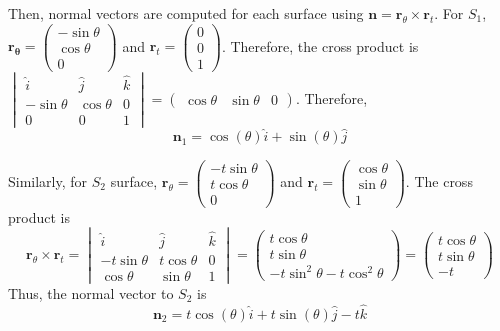\documentclass{article}
\begin{document}
Then, normal vectors are computed for each surface using $\mathbf{n} = \mathbf{r}_{\theta} \times \mathbf{r}_{t}$. For $S_1$, $\mathbf{r_\theta} = \begin{pmatrix} -\sin \theta \\ \cos \theta \\ 0  \end{pmatrix}$ and $\mathbf{r}_{t} = \begin{pmatrix} 0 \\ 0 \\ 1  \end{pmatrix}$. Therefore, the cross product is $\begin{vmatrix} \hat{i} & \hat{j} & \hat{k} \\ -\sin \theta & \cos \theta & 0 \\ 0 & 0 & 1 \end{vmatrix} = \begin{pmatrix} \cos \theta & \sin \theta & 0  \end{pmatrix}$. Therefore,
\begin{equation*}
  \mathbf{n}_{1} = \cos(\theta)\hat{i} + \sin(\theta)\hat{j}
\end{equation*}

Similarly, for $S_2$ surface, $\mathbf{r}_{\theta} = \begin{pmatrix} -t\sin \theta \\ t\cos \theta \\ 0 \end{pmatrix}$ and $\mathbf{r}_{t} = \begin{pmatrix} \cos \theta \\ \sin \theta \\ 1 \end{pmatrix}$. The cross product is
\begin{equation*}
  \mathbf{r}_{\theta} \times \mathbf{r}_{t} = 
  \begin{vmatrix}
    \hat{i} & \hat{j} & \hat{k} \\
    -t\sin \theta & t\cos \theta & 0 \\
    \cos \theta & \sin \theta & 1
  \end{vmatrix} =
  \begin{pmatrix}
    t\cos \theta \\ t\sin \theta \\ -t \sin^2 \theta - t\cos^2 \theta
  \end{pmatrix} =
  \begin{pmatrix}
    t\cos \theta \\ t\sin \theta \\ -t
  \end{pmatrix}
\end{equation*}
Thus, the normal vector to $S_2$ is
\begin{equation*}
  \mathbf{n}_{2} = t\cos(\theta)\hat{i} + t\sin(\theta)\hat{j} - t\hat{k}
\end{equation*}
\end{document}
